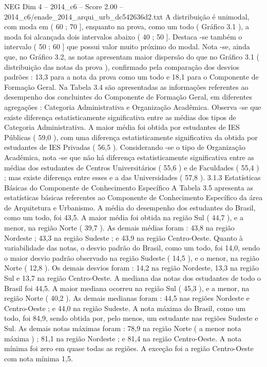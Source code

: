 \begin{textsample}{NEG Dim 4 – 2014\_c6 – Score 2.00 – 2014\_c6/enade\_2014\_arqui\_urb\_dc542636d2.txt}
A distribuição é unimodal, com moda em ( 60 ; 70 ], enquanto na prova, como um todo ( Gráfico 3.1 ), a moda foi alcançada dois intervalos abaixo ( 40 ; 50 ].
Destaca -se também o intervalo ( 50 ; 60 ] que possui valor muito próximo do modal.
Nota -se, ainda que, no Gráfico 3.2, as notas apresentam maior dispersão do que no Gráfico 3.1 ( distribuição das notas da prova ), confirmado pela comparação dos desvios padrões : 13,3 para a nota da prova como um todo e 18,1 para o Componente de Formação Geral.
Na Tabela 3.4 são apresentadas as informações referentes ao desempenho dos concluintes do Componente de Formação Geral, em diferentes agregações : Categoria Administrativa e Organização Acadêmica.
Observa -se que existe diferença estatisticamente significativa entre as médias dos tipos de Categoria Administrativa.
A maior média foi obtida por estudantes de IES Públicas ( 59,0 ), com uma diferença estatisticamente significativa da obtida por estudantes de IES Privadas ( 56,5 ).
Considerando -se o tipo de Organização Acadêmica, nota -se que não há diferença estatisticamente significativa entre as médias dos estudantes de Centros Universitários ( 55,6 ) e de Faculdades ( 55,4 ) ; mas existe diferença entre esses e a das Universidades ( 57,8 ). 3.1.3 Estatísticas Básicas do Componente de Conhecimento Específico A Tabela 3.5 apresenta as estatísticas básicas referentes ao Componente de Conhecimento Específico da área de Arquitetura e Urbanismo.
A média do desempenho dos estudantes do Brasil, como um todo, foi 43,5.
A maior média foi obtida na região Sul ( 44,7 ), e a menor, na região Norte ( 39,7 ).
As demais médias foram : 43,8 na região Nordeste ; 43,3 na região Sudeste ; e 43,9 na região Centro-Oeste.
Quanto à variabilidade das notas, o desvio padrão do Brasil, como um todo, foi 14,0, sendo o maior desvio padrão observado na região Sudeste ( 14,5 ), e o menor, na região Norte ( 12,8 ).
Os demais desvios foram : 14,2 na região Nordeste, 13,3 na região Sul e 13,7 na região Centro-Oeste.
A mediana das notas dos estudantes de todo o Brasil foi 44,5.
A maior mediana ocorreu na região Sul ( 45,3 ), e a menor, na região Norte ( 40,2 ).
As demais medianas foram : 44,5 nas regiões Nordeste e Centro-Oeste ; e 44,0 na região Sudeste.
A nota máxima do Brasil, como um todo, foi 84,9, sendo obtida por, pelo menos, um estudante nas regiões Sudeste e Sul.
As demais notas máximas foram : 78,9 na região Norte ( a menor nota máxima ) ; 81,1 na região Nordeste ; e 81,4 na região Centro-Oeste.
A nota mínima foi zero em quase todas as regiões.
A exceção foi a região Centro-Oeste com nota mínima 1,5.

\end{textsample}
